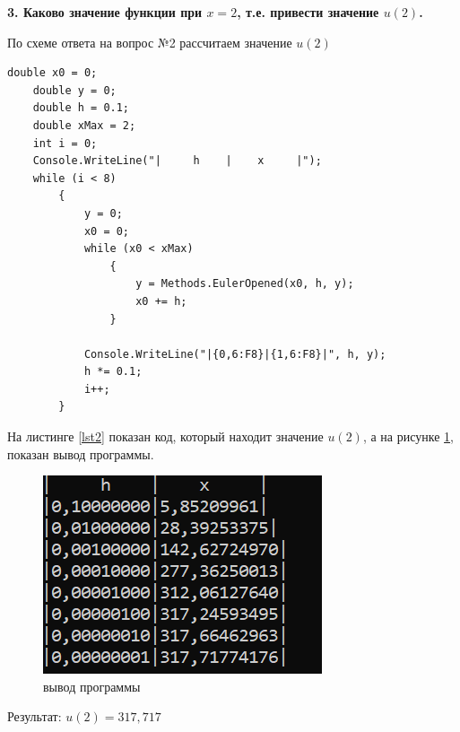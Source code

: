 \hspace{0cm} \textbf{3. Каково значение функции при $x=2$, т.е. привести значение $u(2)$.}

По схеме ответа на вопрос №2 рассчитаем значение $u(2)$

\begin{lstlisting}[caption=вычисление значение функции при $u(2)$, label=lst2]
    double x0 = 0;
    double y = 0;
    double h = 0.1;
    double xMax = 2;
    int i = 0;
    Console.WriteLine("|     h    |    x     |");
    while (i < 8)
        {
            y = 0;
            x0 = 0;
            while (x0 < xMax)
                {
                    y = Methods.EulerOpened(x0, h, y);
                    x0 += h;
                }

            Console.WriteLine("|{0,6:F8}|{1,6:F8}|", h, y);
            h *= 0.1;
            i++;
        }
\end{lstlisting}

На листинге \ref{lst2} показан код, который находит значение $u(2)$, а на рисунке \ref{fig:fig1}, показан вывод программы.

\begin{figure}[ht!]
  \centering
  \includegraphics[scale=1]{img/question3_result.png}
  \caption{вывод программы}
  \label{fig:fig1}
\end{figure}

Результат: $u(2) = 317,717$

